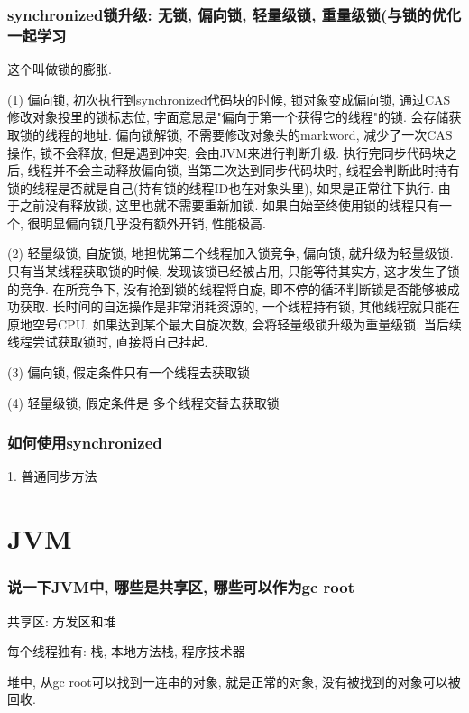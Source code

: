 \documentclass[UTF8]{ctexart}
\begin{document}
\subsubsection{synchronized锁升级: 无锁, 偏向锁, 轻量级锁, 重量级锁(与锁的优化一起学习}
这个叫做锁的膨胀. \par
(1) 偏向锁, 初次执行到synchronized代码块的时候, 锁对象变成偏向锁, 通过CAS修改对象投里的锁标志位, 字面意思是"偏向于第一个获得它的线程"的锁. 会存储获取锁的线程的地址. 偏向锁解锁, 不需要修改对象头的markword, 减少了一次CAS操作, 锁不会释放, 但是遇到冲突, 会由JVM来进行判断升级. 执行完同步代码块之后, 线程并不会主动释放偏向锁, 当第二次达到同步代码块时, 线程会判断此时持有锁的线程是否就是自己(持有锁的线程ID也在对象头里), 如果是正常往下执行. 由于之前没有释放锁, 这里也就不需要重新加锁. 如果自始至终使用锁的线程只有一个, 很明显偏向锁几乎没有额外开销, 性能极高. \par
(2) 轻量级锁, 自旋锁, 地担忧第二个线程加入锁竞争, 偏向锁, 就升级为轻量级锁. 只有当某线程获取锁的时候, 发现该锁已经被占用, 只能等待其实方, 这才发生了锁的竞争. 在所竞争下, 没有抢到锁的线程将自旋, 即不停的循环判断锁是否能够被成功获取. 长时间的自选操作是非常消耗资源的, 一个线程持有锁, 其他线程就只能在原地空号CPU. 如果达到某个最大自旋次数, 会将轻量级锁升级为重量级锁. 当后续线程尝试获取锁时, 直接将自己挂起.\par
(3) 偏向锁, 假定条件只有一个线程去获取锁 \par
(4) 轻量级锁, 假定条件是 多个线程交替去获取锁 \par
\subsubsection{如何使用synchronized}
1. 普通同步方法

\section{JVM}
\subsubsection{说一下JVM中, 哪些是共享区, 哪些可以作为gc root}
共享区: 方发区和堆 \par
每个线程独有: 栈, 本地方法栈, 程序技术器 \par
堆中, 从gc root可以找到一连串的对象, 就是正常的对象, 没有被找到的对象可以被回收.
\end{document}
